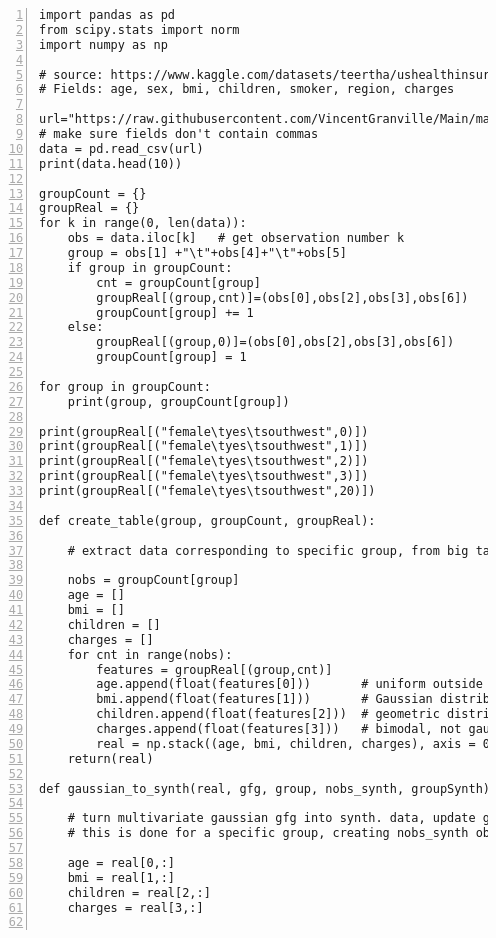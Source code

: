 \documentclass[oneside,10pt]{book}
\begin{document}
\begin{lstlisting}[numbers=left]
import pandas as pd
from scipy.stats import norm
import numpy as np

# source: https://www.kaggle.com/datasets/teertha/ushealthinsurancedataset
# Fields: age, sex, bmi, children, smoker, region, charges
    
url="https://raw.githubusercontent.com/VincentGranville/Main/main/insurance.csv"
# make sure fields don't contain commas
data = pd.read_csv(url)
print(data.head(10))

groupCount = {}
groupReal = {}
for k in range(0, len(data)):  
    obs = data.iloc[k]   # get observation number k
    group = obs[1] +"\t"+obs[4]+"\t"+obs[5]
    if group in groupCount:
        cnt = groupCount[group]
        groupReal[(group,cnt)]=(obs[0],obs[2],obs[3],obs[6]) 
        groupCount[group] += 1    
    else:
        groupReal[(group,0)]=(obs[0],obs[2],obs[3],obs[6]) 
        groupCount[group] = 1

for group in groupCount:
    print(group, groupCount[group])

print(groupReal[("female\tyes\tsouthwest",0)])
print(groupReal[("female\tyes\tsouthwest",1)])
print(groupReal[("female\tyes\tsouthwest",2)])
print(groupReal[("female\tyes\tsouthwest",3)])
print(groupReal[("female\tyes\tsouthwest",20)])

def create_table(group, groupCount, groupReal):

    # extract data corresponding to specific group, from big table groupReal

    nobs = groupCount[group]
    age = []
    bmi = []
    children = []
    charges = []
    for cnt in range(nobs):
        features = groupReal[(group,cnt)]
        age.append(float(features[0]))       # uniform outside very young or very old
        bmi.append(float(features[1]))       # Gaussian distribution?
        children.append(float(features[2]))  # geometric distribution?
        charges.append(float(features[3]))   # bimodal, not gaussian 
        real = np.stack((age, bmi, children, charges), axis = 0)
    return(real)

def gaussian_to_synth(real, gfg, group, nobs_synth, groupSynth):

    # turn multivariate gaussian gfg into synth. data, update groupSynth 
    # this is done for a specific group, creating nobs_synth obs.

    age = real[0,:]
    bmi = real[1,:]
    children = real[2,:]
    charges = real[3,:]


\end{lstlisting}
\end{document}
